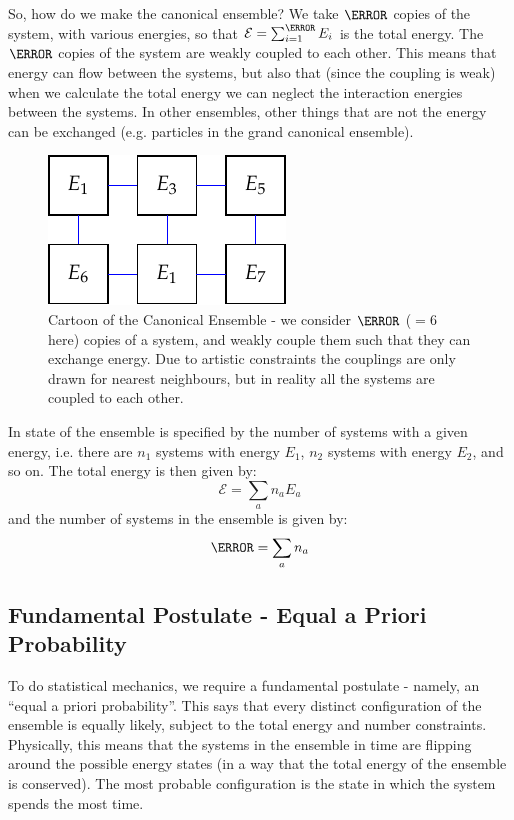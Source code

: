 So, how do we make the canonical ensemble? We take $\N$ copies of the system, with various energies, so that $\mathcal{E} = \sum_{i=1}^{\N} E_i$ is the total energy. The $\N$ copies of the system are weakly coupled to each other. This means that energy can flow between the systems, but also that (since the coupling is weak) when we calculate the total energy we can neglect the interaction energies between the systems. In other ensembles, other things that are not the energy can be exchanged (e.g. particles in the grand canonical ensemble).

\begin{figure}[htbp]
    \centering
    \includegraphics[]{Images/fig-canonicalensemble.pdf}
    
    \caption{Cartoon of the Canonical Ensemble - we consider $\N$ ($= 6$ here) copies of a system, and weakly couple them such that they can exchange energy. Due to artistic constraints the couplings are only drawn for nearest neighbours, but in reality all the systems are coupled to each other.}
    \label{fig-canonicalensemble}
\end{figure}

In state of the ensemble is specified by the number of systems with a given energy, i.e. there are $n_1$ systems with energy $E_1$, $n_2$ systems with energy $E_2$, and so on. The total energy is then given by:
\begin{equation}
    \mathcal{E} = \sum_{a} n_a E_a
\end{equation}
and the number of systems in the ensemble is given by:
\begin{equation}
    \N = \sum_a n_a
\end{equation}

\subsection{Fundamental Postulate - Equal a Priori Probability}
To do statistical mechanics, we require a fundamental postulate - namely, an ``equal a priori probability''. This says that every distinct configuration of the ensemble is equally likely, subject to the total energy and number constraints. Physically, this means that the systems in the ensemble in time are flipping around the possible energy states (in a way that the total energy of the ensemble is conserved). The most probable configuration is the state in which the system spends the most time.

